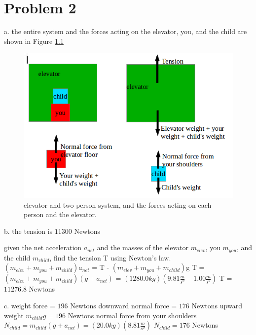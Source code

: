 \chapter{Problem 2}
\label{Problem 2}
a. the entire system and the forces acting on the elevator, you, and the child are shown
in Figure \ref{fig:partA}

\begin{figure}[h]
	\centering
	\includegraphics[scale=0.85]{figures/exam2problem2partA_image.png}
	\caption{elevator and two person system, and the forces acting on each person and the elevator.}
	\label{fig:partA}
\end{figure}

b. the tension is $11300$ Newtons
                                              
given the net acceleration $a_{net}$ and the masses of the elevator $m_{elev}$, you $m_{you}$, and
the child $m_{child}$, find the tension T using Newton's law.\newline
$(m_{elev} + m_{you} + m_{child})a_{net}$ = T - $(m_{elev} + m_{you} + m_{child})$g \newline
T = $(m_{elev} + m_{you} + m_{child})(g + a_{net})$ = $(1280.0 kg)(9.81 \frac{m}{s^{2}} - 1.00 \frac{m}{s^{2}})$\newline
T = $11276.8$ Newtons

c. weight force = $196$ Newtons downward   normal force = $176$ Newtons upward\newline
weight $m_{child}g = 196$ Newtons\newline
normal force from your shoulders $N_{child} = m_{child}(g + a_{net}) = (20.0 kg)(8.81 \frac{m}{s^{2}})$\newline
$N_{child} = 176$ Newtons


